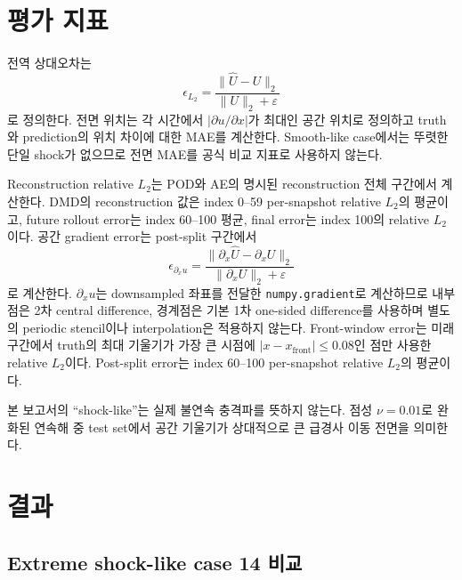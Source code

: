 \documentclass[11pt,a4paper]{article}
\newcommand{\relLtwo}{\ensuremath{\epsilon_{L_2}}}
\begin{document}
\section{평가 지표}

전역 상대오차는
\begin{equation}
  \relLtwo=\frac{\lVert\widehat U-U\rVert_2}{\lVert U\rVert_2+\varepsilon}
\end{equation}
로 정의한다. 전면 위치는 각 시간에서 $|\partial u/\partial x|$가 최대인 공간 위치로 정의하고 truth와 prediction의 위치 차이에 대한 MAE를 계산한다. Smooth-like case에서는 뚜렷한 단일 shock가 없으므로 전면 MAE를 공식 비교 지표로 사용하지 않는다.

Reconstruction relative $L_2$는 POD와 AE의 명시된 reconstruction 전체 구간에서 계산한다. DMD의 reconstruction 값은 index 0--59 per-snapshot relative $L_2$의 평균이고, future rollout error는 index 60--100 평균, final error는 index 100의 relative $L_2$이다. 공간 gradient error는 post-split 구간에서
\begin{equation}
  \epsilon_{\partial_xu}=
  \frac{\lVert\partial_x\widehat U-\partial_xU\rVert_2}
       {\lVert\partial_xU\rVert_2+\varepsilon}
\end{equation}
로 계산한다. $\partial_xu$는 downsampled 좌표를 전달한 \texttt{numpy.gradient}로 계산하므로 내부점은 2차 central difference, 경계점은 기본 1차 one-sided difference를 사용하며 별도의 periodic stencil이나 interpolation은 적용하지 않는다. Front-window error는 미래구간에서 truth의 최대 기울기가 가장 큰 시점에 $|x-x_{\mathrm{front}}|\le0.08$인 점만 사용한 relative $L_2$이다. Post-split error는 index 60--100 per-snapshot relative $L_2$의 평균이다.

본 보고서의 ``shock-like''는 실제 불연속 충격파를 뜻하지 않는다. 점성 $\nu=0.01$로 완화된 연속해 중 test set에서 공간 기울기가 상대적으로 큰 급경사 이동 전면을 의미한다.

\section{결과}

\subsection{Extreme shock-like case 14 비교}

\begin{table}[H]
\centering
\caption{Extreme shock-like case 14의 결과. Training scope가 다르므로 직접 순위표가 아니다.}
\small
{}
\end{table}
\end{document}
